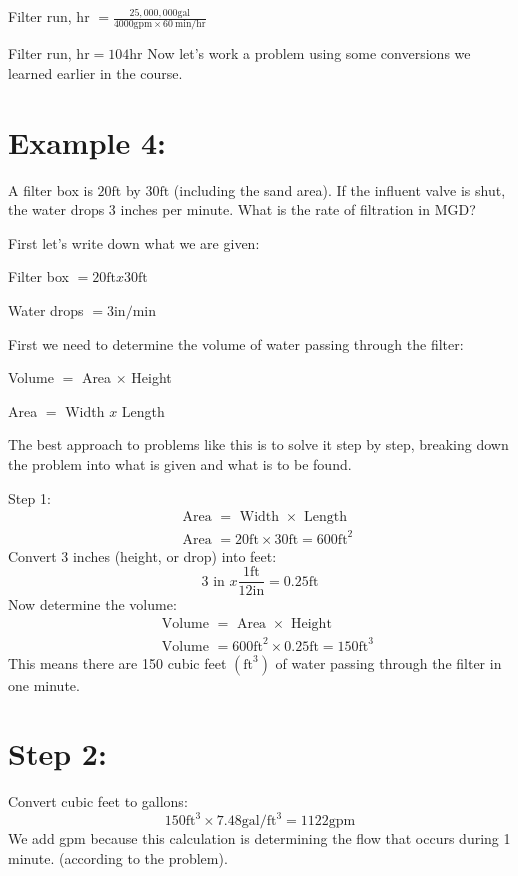 \documentclass[10pt]{article}
\begin{document}
Filter run, hr $=\frac{25,000,000 \mathrm{gal}}{4000 \mathrm{gpm} \times 60 \mathrm{~min} / \mathrm{hr}}$

Filter run, $\mathrm{hr}=104 \mathrm{hr}$ Now let's work a problem using some conversions we learned earlier in the course.

\section{Example 4:}
A filter box is $20 \mathrm{ft}$ by $30 \mathrm{ft}$ (including the sand area). If the influent valve is shut, the water drops 3 inches per minute. What is the rate of filtration in MGD?

First let's write down what we are given:

Filter box $=20 \mathrm{ft} x 30 \mathrm{ft}$

Water drops $=3 \mathrm{in} / \mathrm{min}$

First we need to determine the volume of water passing through the filter:

Volume $=$ Area $\times$ Height

Area $=$ Width $x$ Length

The best approach to problems like this is to solve it step by step, breaking down the problem into what is given and what is to be found.

Step 1:
$$
\begin{aligned}
&\text { Area }=\text { Width } \times \text { Length } \\
&\text { Area }=20 \mathrm{ft} \times 30 \mathrm{ft}=600 \mathrm{ft}^{2}
\end{aligned}
$$
Convert 3 inches (height, or drop) into feet:
$$
3 \text { in } x \frac{1 \mathrm{ft}}{12 \mathrm{in}}=0.25 \mathrm{ft}
$$
Now determine the volume:
$$
\begin{aligned}
&\text { Volume }=\text { Area } \times \text { Height } \\
&\text { Volume }=600 \mathrm{ft}^{2} \times 0.25 \mathrm{ft}=150 \mathrm{ft}^{3}
\end{aligned}
$$
This means there are 150 cubic feet $\left(\mathrm{ft}^{3}\right)$ of water passing through the filter in one minute.

\section{Step 2:}
Convert cubic feet to gallons:
$$
150 \mathrm{ft}^{3} \times 7.48 \mathrm{gal} / \mathrm{ft}^{3}=1122 \mathrm{gpm}
$$
We add gpm because this calculation is determining the flow that occurs during 1 minute. (according to the problem).
\end{document}
